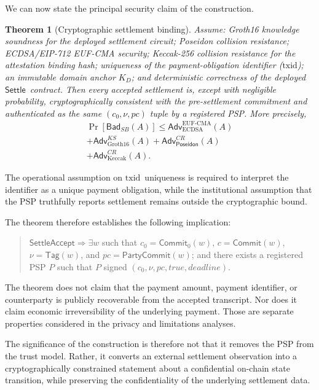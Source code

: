 \documentclass[10pt,twocolumn]{article}
\newtheorem{theorem}{Theorem}
\newcommand{\Poseidon}{\ensuremath{\mathsf{Poseidon}}}
\newcommand{\txid}{\ensuremath{\text{txid}}}
\newcommand{\pc}{\ensuremath{\mathit{pc}}}
\newcommand{\Commit}{\ensuremath{\mathsf{Commit}}}
\newcommand{\Settle}{\ensuremath{\mathsf{Settle}}}
\begin{document}
We can now state the principal security claim of the construction.

\begin{theorem}[Cryptographic settlement binding]
Assume: Groth16 knowledge soundness for the deployed settlement circuit;
Poseidon collision resistance; ECDSA/EIP-712 EUF-CMA security; Keccak-256
collision resistance for the attestation binding hash; uniqueness of the
payment-obligation identifier (\txid); an immutable domain anchor $K_D$;
and deterministic correctness of the deployed \Settle\ contract. Then
every accepted settlement is, except with negligible probability,
cryptographically consistent with the pre-settlement commitment and
authenticated as the same $(c_0,\nu,\pc)$ tuple by a registered PSP. More
precisely,
\begin{multline}
\Pr[\mathsf{Bad}_{SB}(A)] \le \mathsf{Adv}^{\mathrm{EUF\text{-}CMA}}_{\mathrm{ECDSA}}(A) \\
+ \mathsf{Adv}^{KS}_{\mathrm{Groth16}}(A) + \mathsf{Adv}^{CR}_{\Poseidon}(A) \\
+ \mathsf{Adv}^{CR}_{\mathrm{Keccak}}(A). \label{eq:mainbound}
\end{multline}
\end{theorem}

The operational assumption on \txid\ uniqueness is required to interpret
the identifier as a unique payment obligation, while the institutional
assumption that the PSP truthfully reports settlement remains outside the
cryptographic bound.

The theorem therefore establishes the following implication:
\begin{quote}
\small
$\mathsf{SettleAccept} \Rightarrow \exists w$ such that
$c_0=\Commit_0(w)$, $c=\Commit(w)$, $\nu=\mathsf{Tag}(w)$, and
$\pc=\mathsf{PartyCommit}(w)$; and there exists a registered PSP $P$ such
that $P$ signed $(c_0,\nu,\pc,\mathit{true},\mathit{deadline})$.
\end{quote}
The theorem does not claim that the payment amount, payment identifier,
or counterparty is publicly recoverable from the accepted transcript. Nor
does it claim economic irreversibility of the underlying payment. Those
are separate properties considered in the privacy and limitations
analyses.

The significance of the construction is therefore not that it removes
the PSP from the trust model. Rather, it converts an external settlement
observation into a cryptographically constrained statement about a
confidential on-chain state transition, while preserving the
confidentiality of the underlying settlement data.
\end{document}
